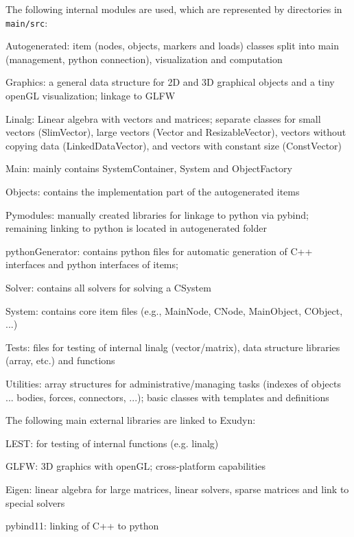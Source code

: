 The following internal modules are used, which are represented by directories in \texttt{main/src}:
\bi
  \item Autogenerated: item (nodes, objects, markers and loads) classes split into main (management, python connection), visualization and computation
  \item Graphics: a general data structure for 2D and 3D graphical objects and a tiny openGL visualization; linkage to GLFW
    \item Linalg: Linear algebra with vectors and matrices; separate classes for small vectors (SlimVector), large vectors (Vector and ResizableVector), vectors without copying data (LinkedDataVector), and vectors with constant size (ConstVector)
  \item Main: mainly contains SystemContainer, System and ObjectFactory
  \item Objects: contains the implementation part of the autogenerated items
  \item Pymodules: manually created libraries for linkage to python via pybind; remaining linking to python is located in autogenerated folder
  \item pythonGenerator: contains python files for automatic generation of C++ interfaces and python interfaces of items;
  \item Solver: contains all solvers for solving a CSystem
  \item System: contains core item files (e.g., MainNode, CNode, MainObject, CObject, ...)
  \item Tests: files for testing of internal linalg (vector/matrix), data structure libraries (array, etc.) and functions
    \item Utilities: array structures for administrative/managing tasks (indexes of objects ... bodies, forces, connectors, ...); basic classes with templates and definitions
\ei

The following main external libraries are linked to Exudyn:
\bi
  \item LEST: for testing of internal functions (e.g. linalg)
  \item GLFW: 3D graphics with openGL; cross-platform capabilities
  \item Eigen: linear algebra for large matrices, linear solvers, sparse matrices and link to special solvers
  \item pybind11: linking of C++ to python
\ei

